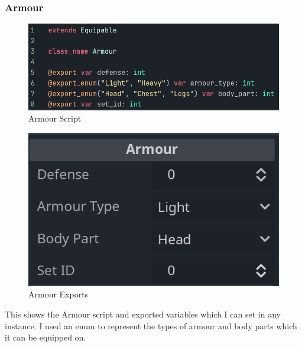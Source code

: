 \documentclass{article}
\begin{document}
        \subsubsection{Armour}
        \begin{multicols}{2}
                \begin{figure}[H]
                        \centering
                        \includegraphics[width = \columnwidth]{images/development/Armour_script.PNG}
                        \caption{Armour Script}
                \end{figure}
                \begin{figure}[H]
                        \centering
                        \includegraphics[width = 0.9\columnwidth]{images/development/Armour_export.PNG}
                        \caption{Armour Exports}
                \end{figure}
        \end{multicols}
        \[\]
        This shows the Armour script and exported variables which I can set in any instance. I used an enum to represent the types of armour and body parts which it can be equipped on.\\
\end{document}
